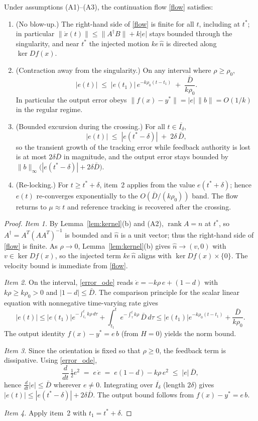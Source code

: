 \documentclass[10pt,a4paper]{amsart}
\DeclareMathOperator{\rank}{\operatorname{rank}}
\begin{document}
\begin{theorem}\label{thm:crossing}
Under assumptions (A1)--(A3), the continuation flow \eqref{flow} satisfies:
\begin{enumerate}
\item[1.] (No blow-up.) The right-hand side of \eqref{flow} is finite for all $t$, including at $t^*$; in particular $\|\dot x(t)\| \le \|A^\dagger B\| + k|e|$ stays bounded through the singularity, and near $t^*$ the injected motion $k e\, \hat n$ is directed along $\ker D f(x)$.
\item[2.] (Contraction away from the singularity.) On any interval where $\rho \ge \rho_0$,
\[
|e(t)| \;\le\; |e(t_1)|\, e^{-k \rho_0 (t - t_1)} \;+\; \frac{\bar D}{k \rho_0}.
\]
In particular the output error obeys $\| f(x) - y^* \| = |e|\, \|b\| = O(1/k)$ in the regular regime.
\item[3.] (Bounded excursion during the crossing.) For all $t \in \overline{I_\delta}$,
\[
|e(t)| \;\le\; |e(t^*-\delta)| \;+\; 2\delta\, \bar D ,
\]
so the transient growth of the tracking error while feedback authority is lost is at most $2\delta\bar D$ in magnitude, and the output error stays bounded by $\|b\|_\infty\bigl(|e(t^*-\delta)| + 2\delta\bar D\bigr)$.
\item[4.] (Re-locking.) For $t \ge t^* + \delta$, item~2 applies from the value $e(t^*+\delta)$; hence $e(t)$ re-converges exponentially to the $O(\bar D/(k\rho_0))$ band. The flow returns to $\mu \approx t$ and reference tracking is recovered after the crossing.
\end{enumerate}
\end{theorem}

\begin{proof}
\emph{Item 1.} By Lemma~\ref{lem:kernel}(b) and (A2), $\rank A = n$ at $t^*$, so $A^\dagger = A^T(AA^T)^{-1}$ is bounded and $\hat n$ is a unit vector; thus the right-hand side of \eqref{flow} is finite. As $\rho \to 0$, Lemma~\ref{lem:kernel}(b) gives $\hat n \to (v, 0)$ with $v \in \ker Df(x)$, so the injected term $ke\,\hat n$ aligns with $\ker Df(x) \times \{0\}$. The velocity bound is immediate from \eqref{flow}.

\emph{Item 2.} On the interval, \eqref{error_ode} reads $\dot e = -k\rho\, e + (1-d)$ with $k\rho \ge k\rho_0 > 0$ and $|1-d| \le \bar D$. The comparison principle for the scalar linear equation with nonnegative time-varying rate gives
\[
|e(t)| \le |e(t_1)| e^{-\int_{t_1}^t k\rho\, d\tau} + \int_{t_1}^t e^{-\int_\tau^t k\rho}\,\bar D\, d\tau \le |e(t_1)| e^{-k\rho_0 (t-t_1)} + \frac{\bar D}{k\rho_0}.
\]
The output identity $f(x) - y^* = e\, b$ (from $H = 0$) yields the norm bound.

\emph{Item 3.} Since the orientation is fixed so that $\rho \ge 0$, the feedback term is dissipative. Using \eqref{error_ode},
\[
\frac{d}{dt}\,\tfrac{1}{2} e^2 \;=\; e\,\dot e \;=\; e(1-d) - k\rho\, e^2 \;\le\; |e|\,\bar D ,
\]
hence $\frac{d}{dt}|e| \le \bar D$ wherever $e \ne 0$. Integrating over $\overline{I_\delta}$ (length $2\delta$) gives $|e(t)| \le |e(t^*-\delta)| + 2\delta\bar D$. The output bound follows from $f(x)-y^* = e\, b$.

\emph{Item 4.} Apply item~2 with $t_1 = t^*+\delta$.
\end{proof}
\end{document}
